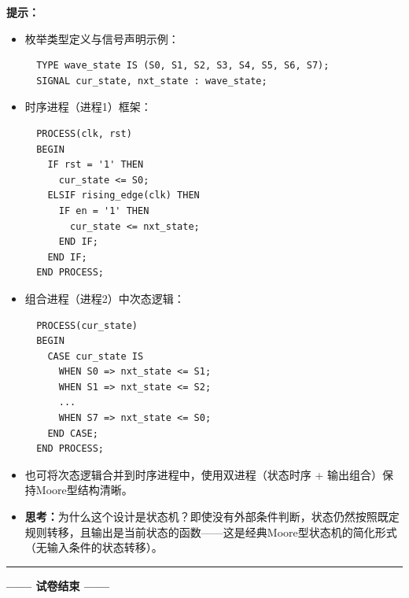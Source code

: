 \begin{framed}
\textbf{提示：}
\begin{itemize}
  \item 枚举类型定义与信号声明示例：
  \begin{verbatim}
  TYPE wave_state IS (S0, S1, S2, S3, S4, S5, S6, S7);
  SIGNAL cur_state, nxt_state : wave_state;
  \end{verbatim}
  \item 时序进程（进程1）框架：
  \begin{verbatim}
  PROCESS(clk, rst)
  BEGIN
    IF rst = '1' THEN
      cur_state <= S0;
    ELSIF rising_edge(clk) THEN
      IF en = '1' THEN
        cur_state <= nxt_state;
      END IF;
    END IF;
  END PROCESS;
  \end{verbatim}
  \item 组合进程（进程2）中次态逻辑：
  \begin{verbatim}
  PROCESS(cur_state)
  BEGIN
    CASE cur_state IS
      WHEN S0 => nxt_state <= S1;
      WHEN S1 => nxt_state <= S2;
      ...
      WHEN S7 => nxt_state <= S0;
    END CASE;
  END PROCESS;
  \end{verbatim}
  \item 也可将次态逻辑合并到时序进程中，使用双进程（状态时序 + 输出组合）保持Moore型结构清晰。
  \item \textbf{思考：}为什么这个设计是状态机？即使没有外部条件判断，状态仍然按照既定规则转移，且输出是当前状态的函数——这是经典Moore型状态机的简化形式（无输入条件的状态转移）。
\end{itemize}
\end{framed}

\vspace{0.8cm}
{\centering
\rule{0.8\textwidth}{0.5pt}
\vspace{0.3cm}

\textbf{—— 试卷结束 ——}

\vspace{0.5cm}}

\endinput
